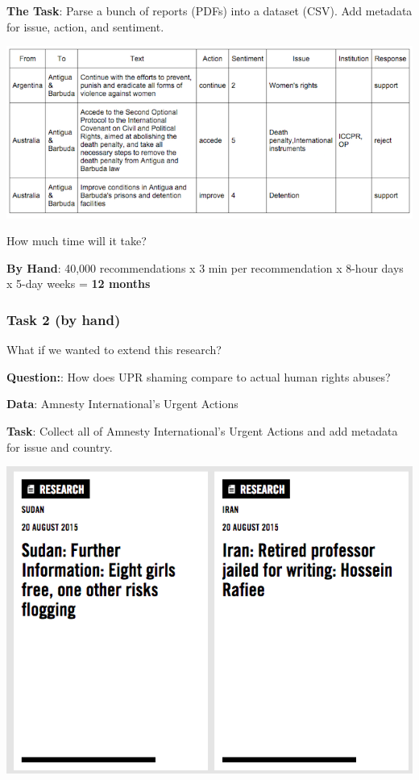 \documentclass[]{book}
\begin{document}
\textbf{The Task}: Parse a bunch of reports (PDFs) into a dataset (CSV).
Add metadata for issue, action, and sentiment.

\begin{center}\includegraphics[width=0.7\linewidth]{img/upr-table} \end{center}

How much time will it take?

\textbf{By Hand}: 40,000 recommendations x 3 min per recommendation x
8-hour days x 5-day weeks = \textbf{12 months}

\subsubsection*{Task 2 (by hand)}\label{task-2-by-hand}

What if we wanted to extend this research?

\textbf{Question:}: How does UPR shaming compare to actual human rights
abuses?

\textbf{Data}: Amnesty International's Urgent Actions

\textbf{Task}: Collect all of Amnesty International's Urgent Actions and
add metadata for issue and country.

\begin{center}\includegraphics[width=0.7\linewidth]{img/amnesty} \end{center}
\end{document}
